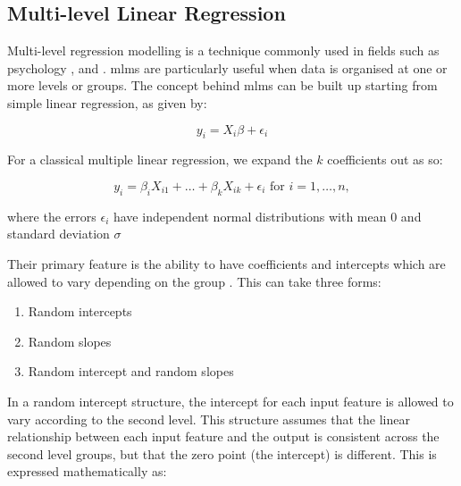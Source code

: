 \subsection{Multi-level Linear Regression}

Multi-level regression modelling is a technique commonly used in fields such as psychology , and . \glspl{mlm} are particularly useful when data is organised at one or more levels or groups. The concept behind \glspl{mlm} can be built up starting from simple linear regression, as given by:

\begin{equation}
  y_i = X_i\beta + \epsilon_i
\end{equation}

For a classical multiple linear regression, we expand the $k$ coefficients out as so:

\begin{equation}
  y_i = \beta_i X_{i1} + \ldots + \beta_k X_{ik} + \epsilon_i \text{ for } i = 1, \ldots, n,
\end{equation}

where the errors $\epsilon_i$ have independent normal distributions with mean 0 and standard deviation $\sigma$

Their primary feature is the ability to have coefficients and intercepts which are allowed to vary depending on the group \citep{Gelman2006Multilevel}. This can take three forms:

\begin{enumerate}
  \item Random intercepts
  \item Random slopes
  \item Random intercept and random slopes
\end{enumerate}

In a random intercept structure, the intercept for each input feature is allowed to vary according to the second level. This structure assumes that the linear relationship between each input feature and the output is consistent across the second level groups, but that the zero point (the intercept) is different. This is expressed mathematically as:

\begin{equation}
\end{equation}

